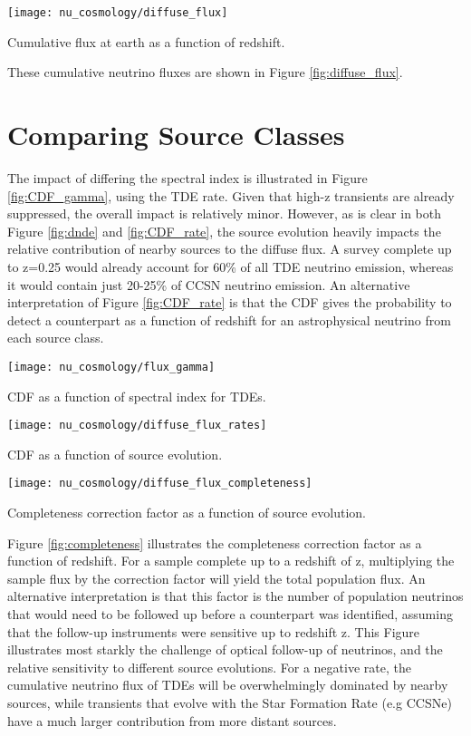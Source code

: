 \begin{marginfigure}
	\centering \texttt{[image: nu\_cosmology/diffuse\_flux]}
	\caption{Cumulative flux at earth as a function of redshift.}
	\label{fig:diffuse_flux}
\end{marginfigure}

These cumulative neutrino fluxes are shown in Figure \ref{fig:diffuse_flux}. 

\section{Comparing Source Classes}

The impact of differing the spectral index is illustrated in Figure \ref{fig:CDF_gamma}, using the TDE rate. Given that high-z transients are already suppressed, the overall impact is relatively minor. However, as is clear in both Figure \ref{fig:dnde} and \ref{fig:CDF_rate}, the source evolution heavily impacts the relative contribution of nearby sources to the diffuse flux. A survey complete up to z=0.25 would already account for 60\% of all TDE neutrino emission, whereas it would contain just 20-25\% of CCSN neutrino emission. An alternative interpretation of Figure \ref{fig:CDF_rate} is that the CDF gives the probability to detect a counterpart as a function of redshift for an astrophysical neutrino from each source class.

\begin{marginfigure}
	\centering \texttt{[image: nu\_cosmology/flux\_gamma]}
	\caption{CDF as a function of spectral index for TDEs.}
	\label{fig:CDF_gamma}
\end{marginfigure}


\begin{marginfigure}
	\centering \texttt{[image: nu\_cosmology/diffuse\_flux\_rates]}
	\caption{CDF as a function of source evolution.}
	\label{fig:CDF_rate}
\end{marginfigure}

\begin{marginfigure}
	\centering \texttt{[image: nu\_cosmology/diffuse\_flux\_completeness]}
	\caption{Completeness correction factor as a function of source evolution.}
	\label{fig:completeness}
\end{marginfigure}

Figure \ref{fig:completeness} illustrates the completeness correction factor as a function of redshift. For a sample complete up to a redshift of z, multiplying the sample flux by the correction factor will yield the total population flux. An alternative interpretation is that this factor is the number of population neutrinos that would need to be followed up before a counterpart was identified, assuming that the follow-up instruments were sensitive up to redshift z. This Figure illustrates most starkly the challenge of optical follow-up of neutrinos, and the relative sensitivity to different source evolutions. For a negative rate, the cumulative neutrino flux of TDEs will be overwhelmingly dominated by nearby sources, while transients that evolve with the Star Formation Rate (e.g CCSNe) have a much larger contribution from more distant sources.

